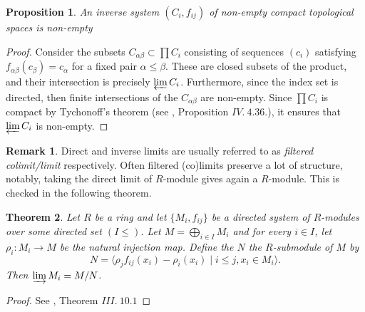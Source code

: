 \documentclass{article}
\theoremstyle{plain}
\newtheorem{theorem}{Theorem}[subsection]
\newtheorem{proposition}[theorem]{Proposition}
\theoremstyle{definition}
\newtheorem{remark}{Remark}
\begin{document}
\begin{proposition}
\label{compact_inverse_system}
    An inverse system $(C_i,f_{ij})$ of non-empty compact topological spaces is non-empty
\end{proposition}
\begin{proof}
    Consider the subsets $C_{\alpha\beta} \subset \prod C_{i}$ consisting of sequences $(c_i)$ satisfying $f_{\alpha\beta}(c_{\beta}) = c_{\alpha}$ for a fixed pair $\alpha\leq \beta$.
    These are closed subsets of the product, and their intersection is precisely $\varprojlim C_i$.
    Furthermore, since the index set is directed, then finite intersections of the $C_{\alpha\beta}$ are non-empty.
    Since $\prod C_i$ is compact by Tychonoff's theorem (see \cite{Intro_manifolds}, Proposition $IV.\:4.36.$), it ensures that $\varprojlim C_i$ is non-empty.
\end{proof}


\begin{remark}
\label{direct_limit_modules}
    Direct and inverse limits are usually referred to as \textit{filtered colimit/limit} respectively. 
    Often filtered (co)limits preserve a lot of structure, notably, taking the direct limit of $R$-module gives again a $R$-module. This is checked in the following theorem.
\end{remark}



\begin{theorem}
\label{direct_limit_R_module}
    Let $R$ be a ring and let $\{M_i, f_{ij}\}$ be a directed system of $R$-modules over some directed set $(I\leq)$.
    Let $M=\bigoplus_{i\in I}M_i$ and for every $i\in I$, let $\rho_i:M_i\rightarrow M$ be the natural injection map.
    Define the $N$ the $R$-submodule of $M$ by 
    $$N = \langle \rho_jf_{ij}(x_i) - \rho_i(x_i) \mid i\leq j,x_i\in M_i\rangle.$$
    Then $\varinjlim M_i = M/N$.
\end{theorem}
\begin{proof}
    See \cite{Lang_algebra}, Theorem $III.\:10.1$
\end{proof}
\end{document}
